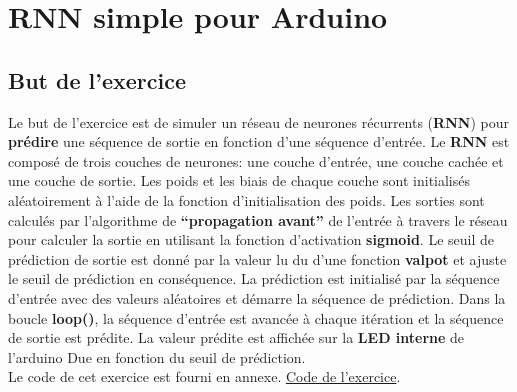 \chapter{RNN simple pour Arduino}

\section{But de l'exercice}
Le but de l'exercice est de simuler un réseau de neurones récurrents (\textbf{RNN}) pour \textbf{prédire} une séquence de sortie en fonction d'une séquence d'entrée. 
Le \textbf{RNN} est composé de trois couches de neurones: une couche d'entrée, une couche cachée et une
couche de sortie. Les poids et les biais de chaque couche sont initialisés aléatoirement à l'aide
de la fonction d'initialisation des poids. Les sorties sont calculés par l'algorithme de
\textbf{``propagation avant''} de l'entrée à travers le réseau pour calculer la sortie en utilisant la fonction
d'activation \textbf{sigmoid}. Le seuil de prédiction de sortie est donné par la valeur lu du d'une
fonction \textbf{valpot} et ajuste le seuil de prédiction en conséquence. La prédiction est initialisé par
la séquence d'entrée avec des valeurs aléatoires et démarre la séquence de prédiction. Dans
la boucle \textbf{loop()}, la séquence d'entrée est avancée à chaque itération et la séquence de sortie
est prédite. La valeur prédite est affichée sur la \textbf{LED interne} de l'arduino Due en fonction du
seuil de prédiction. \\

Le code de cet exercice est fourni en annexe. \hyperref[sec:RNN-code]{Code de l'exercice}.
